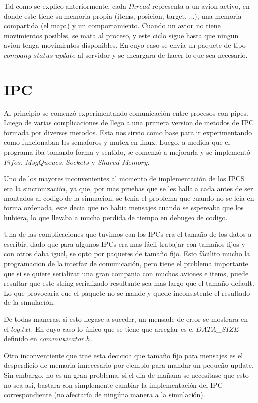 \documentclass[a4paper,12pt,spanish]{article} %
\begin{document}
Tal como se explico anteriormente, cada $Thread$ representa a un
avion activo, en donde este tiene su memoria propia (items, posicion,
target, ...), una memoria compartida (el mapa) y un comportamiento.
Cuando un avion no tiene movimientos posibles, se mata al proceso,
y este ciclo sigue hasta que ningun avion tenga movimientos disponibles.
En cuyo caso se envia un paquete de tipo $company$ $status$ $update$
al servidor y se encargara de hacer lo que sea necesario.

\pagebreak{}


\section{IPC}

Al principio se comenzó experimentando comunicación entre procesos
con pipes. Luego de varias complicaciones de llego a una primera version
de metodos de IPC formada por diversos metodos. Esta nos sirvio como
base para ir experimentando como funcionaban los semaforos y mutex
en linux. Luego, a medida que el programa iba tomando forma y sentido,
se comenzó a mejorarla y se implementó $Fifos$, $MsgQueues$, $Sockets$
y $Shared$ $Memory$.

Uno de los mayores inconvenientes al momento de implementación de
los IPCS era la sincronización, ya que, por mas pruebas que se les
halla a cada antes de ser montados al codigo de la simuacion, se tenia
el problema que cuando no se leia en forma ordenada, este decia que
no habia mensajes cuando se espereaba que los hubiera, lo que llevaba
a mucha perdida de tiempo en debugeo de codigo.

Una de las complicaciones que tuvimos con los IPCs era el tamaño de
los datos a escribir, dado que para algunos IPCs era mas fácil trabajar
con tamaños fijos y con otros daba igual, se opto por paquetes de
tamaño fijo. Esto fácilito mucho la programacion de la interfaz de
comunicación, pero tiene el problema importante que si se quiere serializar
una gran compania con muchos aviones e items, puede resultar que este
string serializado resultante sea mas largo que el tamaño default.
Lo que provocaria que el paquete no se mande y quede inconsistente
el resultado de la simulación. 

De todas maneras, si esto llegase a suceder, un mensade de error se
mostrara en el $log.txt$. En cuyo caso lo único que se tiene que
arreglar es el $DATA$\_$SIZE$ definido en $communicator.h$.

Otro inconventiente que trae esta decicion que tamaño fijo para mensajes
es el desperdicio de memoria innecesario por ejemplo para mandar un
pequeño update. Sin embargo, no es un gran problema, si el dia de
mañana se necesitase que esto no sea asi, bastara con simplemente
cambiar la implementación del IPC correspondiente (no afectaría de
ningúna manera a la simulación).\\
\end{document}
